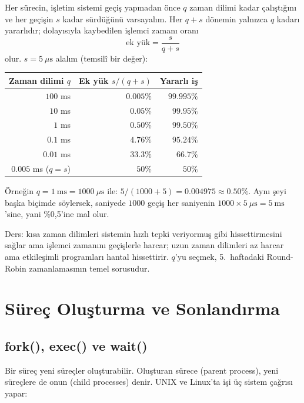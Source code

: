 \begin{example}
Her sürecin, işletim sistemi geçiş yapmadan önce $q$ zaman dilimi kadar çalıştığını ve her geçişin $s$ kadar sürdüğünü varsayalım. Her $q + s$ dönemin yalnızca $q$ kadarı yararlıdır; dolayısıyla kaybedilen işlemci zamanı oranı
\[
\text{ek yük} = \frac{s}{q + s}
\]
olur. $s = 5\ \mu\text{s}$ alalım (temsilî bir değer):
\begin{center}
\renewcommand{\arraystretch}{1.25}
\begin{tabular}{@{}rrr@{}}
\toprule
\textbf{Zaman dilimi $q$} & \textbf{Ek yük $s/(q+s)$} & \textbf{Yararlı iş} \\
\midrule
$100$ ms & $0.005\%$ & $99.995\%$ \\
$10$ ms & $0.05\%$ & $99.95\%$ \\
$1$ ms & $0.50\%$ & $99.50\%$ \\
$0.1$ ms & $4.76\%$ & $95.24\%$ \\
$0.01$ ms & $33.3\%$ & $66.7\%$ \\
$0.005$ ms ($q = s$) & $50\%$ & $50\%$ \\
\bottomrule
\end{tabular}
\end{center}
Örneğin $q = 1\ \text{ms} = 1000\ \mu\text{s}$ ile: $5/(1000+5) = 0.004975 \approx 0.50\%$. Aynı şeyi başka biçimde söylersek, saniyede $1000$ geçiş her saniyenin $1000 \times 5\ \mu\text{s} = 5\ \text{ms}$'sine, yani \%0,5'ine mal olur.

Ders: kısa zaman dilimleri sistemin hızlı tepki veriyormuş gibi hissettirmesini sağlar ama işlemci zamanını geçişlerle harcar; uzun zaman dilimleri az harcar ama etkileşimli programları hantal hissettirir. $q$'yu seçmek, 5.~haftadaki Round-Robin zamanlamasının temel sorusudur.
\end{example}

\section{Süreç Oluşturma ve Sonlandırma}
\label{sec:creation}

\subsection{fork(), exec() ve wait()}

Bir süreç yeni süreçler oluşturabilir. Oluşturan sürece  (parent process), yeni süreçlere de onun  (child processes) denir. UNIX ve Linux'ta işi üç sistem çağrısı yapar:

